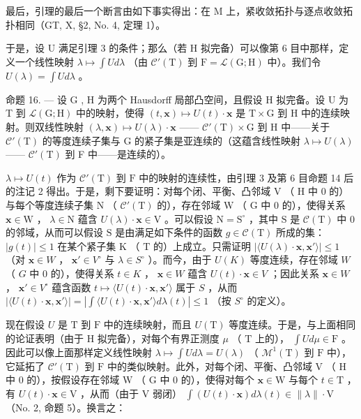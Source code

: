 最后，引理的最后一个断言由如下事实得出：在 M 上，紧收敛拓扑与逐点收敛拓扑相同（GT, X, §2, No. 4, 定理 1）。

于是，设 U 满足引理 3 的条件；那么（若 H 拟完备）可以像第 6 目中那样，定义一个线性映射 \(\lambda \mapsto \int U d\lambda\) （由 \(\mathcal{C}'(\mathrm{T})\) 到 \(\mathrm{F} = \mathcal{L}(\mathrm{G}; \mathrm{H})\) 中）。我们令 \(U(\lambda) = \int U d\lambda\) 。

命题 16. --- 设 G , H 为两个 Hausdorff 局部凸空间，且假设 H 拟完备。设 U 为 T 到 \(\mathcal{L}(\mathrm{G};\mathrm{H})\) 中的映射，使得 \((t,\mathbf{x})\mapsto U(t)\cdot \mathbf{x}\) 是 \(\mathrm{T}\times \mathrm{G}\) 到 H 中的连续映射。则双线性映射 \((\lambda ,\mathbf{x})\mapsto U(\lambda)\cdot \mathbf{x}\) —— \(\mathcal{C}'(\mathrm{T})\times \mathrm{G}\) 到 H 中——关于 \(\mathcal{C}'(\mathrm{T})\) 的等度连续子集与 G 的紧子集是亚连续的（这蕴含线性映射 \(\lambda \mapsto U(\lambda)\) —— \(\mathcal{C}'(\mathrm{T})\) 到 F 中——是连续的）。

\(\lambda \mapsto U(t)\) 作为 \(\mathcal{C}'(\mathrm{T})\) 到 \(\mathrm{F}\) 中的映射的连续性，由引理 3 及第 6 目命题 14 后的注记 2 得出。于是，剩下要证明：对每个闭、平衡、凸邻域 \(\mathrm{V}\) （ \(\mathrm{H}\) 中 0 的）与每个等度连续子集 \(\mathrm{N}\) （ \(\mathcal{C}'(\mathrm{T})\) 的），存在邻域 \(\mathrm{W}\) （ \(\mathrm{G}\) 中 0 的），使得关系 \(\mathbf{x} \in \mathrm{W}\) ， \(\lambda \in \mathrm{N}\) 蕴含 \(U(\lambda) \cdot \mathbf{x} \in \mathrm{V}\) 。可以假设 \(\mathrm{N} = \mathrm{S}^{\circ}\) ，其中 \(\mathrm{S}\) 是 \(\mathcal{C}(\mathrm{T})\) 中 0 的邻域，从而可以假设 \(\mathrm{S}\) 是由满足如下条件的函数 \(g \in \mathcal{C}(\mathrm{T})\) 所成的集：\(|g(t)| \leqslant 1\) 在某个紧子集 \(\mathrm{K}\) （ \(\mathrm{T}\) 的）上成立。只需证明 \(|\langle U(\lambda) \cdot \mathbf{x}, \mathbf{x}' \rangle| \leqslant 1\) （对 \(\mathbf{x} \in W\) ， \(\mathbf{x}' \in V^\circ\) 与 \(\lambda \in S^\circ\) ）。而今，由于 \(U(K)\) 等度连续，存在邻域 \(W\) （ \(G\) 中 0 的），使得关系 \(t \in K\) ， \(\mathbf{x} \in W\) 蕴含 \(U(t) \cdot \mathbf{x} \in V\) ；因此关系 \(\mathbf{x} \in W\) ， \(\mathbf{x}' \in V^\circ\) 蕴含函数 \(t \mapsto \langle U(t) \cdot \mathbf{x}, \mathbf{x}' \rangle\) 属于 \(S\) ，从而 \(|\langle U(t) \cdot \mathbf{x}, \mathbf{x}' \rangle| = |\int\langle U(t) \cdot \mathbf{x}, \mathbf{x}' \rangle d\lambda(t)| \leqslant 1\) （按 \(S^\circ\) 的定义）。

现在假设 \(U\) 是 \(\mathrm{T}\) 到 \(\mathrm{F}\) 中的连续映射，而且 \(U(\mathrm{T})\) 等度连续。于是，与上面相同的论证表明（由于 \(\mathrm{H}\) 拟完备），对每个有界正测度 \(\mu\) （ \(\mathrm{T}\) 上的）， \(\int U d\mu \in \mathrm{F}\) 。因此可以像上面那样定义线性映射 \(\lambda \mapsto \int U d\lambda = U(\lambda)\) （ \(\mathcal{M}^1(\mathrm{T})\) 到 \(\mathrm{F}\) 中），它延拓了 \(\mathcal{C}'(\mathrm{T})\) 到 \(\mathrm{F}\) 中的类似映射。此外，对每个闭、平衡、凸邻域 \(\mathrm{V}\) （ \(\mathrm{H}\) 中 0 的），按假设存在邻域 \(\mathrm{W}\) （ \(\mathrm{G}\) 中 0 的），使得对每个 \(\mathbf{x} \in \mathrm{W}\) 与每个 \(t \in \mathrm{T}\) ，有 \(U(t) \cdot \mathbf{x} \in \mathrm{V}\) ，从而（由于 \(\mathrm{V}\) 弱闭） \(\int (U(t) \cdot \mathbf{x}) d\lambda(t) \in \| \lambda \| \cdot \mathrm{V}\) （No. 2, 命题 5）。换言之：

